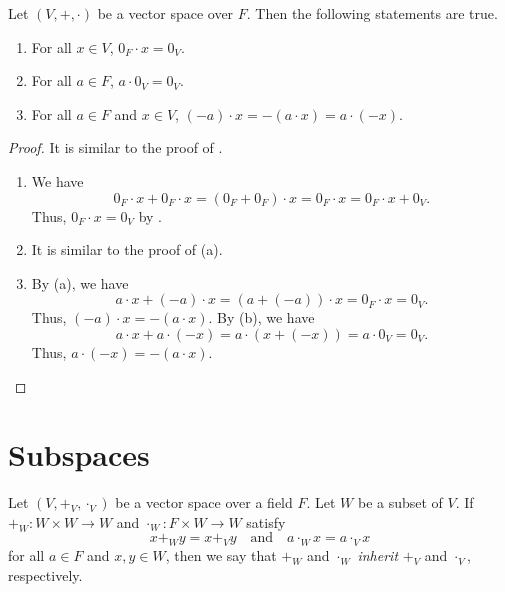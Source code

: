 \begin{theorem}\label{thm:vector-space-multiplication}
  Let $(V, +, \cdot)$ be a vector space over $F$.
  Then the following statements are true.
  \begin{enumerate}
    \item For all $x \in V$, $0_F \cdot x = 0_V$.
    \item For all $a \in F$, $a \cdot 0_V = 0_V$.
    \item For all $a \in F$ and $x \in V$,
      $(-a) \cdot x = -(a \cdot x) = a \cdot (-x)$.
  \end{enumerate}
\end{theorem}
\begin{proof}
  It is similar to the proof of .
  \begin{enumerate}
    \item We have
      $$
      0_F \cdot x + 0_F \cdot x
      = (0_F + 0_F) \cdot x
      = 0_F \cdot x
      = 0_F \cdot x + 0_V.
      $$
      Thus, $0_F \cdot x = 0_V$ by .
    \item It is similar to the proof of (a).
    \item By (a), we have
      $$
      a \cdot x + (-a) \cdot x
      = (a + (-a)) \cdot x
      = 0_F \cdot x
      = 0_V.
      $$
      Thus, $(-a) \cdot x = -(a \cdot x)$.
      By (b), we have
      $$
      a \cdot x + a \cdot (-x)
      = a \cdot (x + (-x))
      = a \cdot 0_V
      = 0_V.
      $$
      Thus, $a \cdot (-x) = -(a \cdot x)$. \qedhere
  \end{enumerate}
\end{proof}

\section{Subspaces}
\begin{definition}\label{def:inheritance}
  Let $(V, +_V, \cdot_V)$ be a vector space over a field $F$.
  Let $W$ be a subset of $V$.
  If $+_W: W \times W \to W$ and $\cdot_W: F \times W \to W$
  satisfy
  \begin{equation*}
    x +_W y = x +_V y
      \quad \text{and}
      \quad a \cdot_W x = a \cdot_V x
  \end{equation*}
  for all $a \in F$ and $x, y \in W$, then we say that $+_W$ and $\cdot_W$
  \emph{inherit} $+_V$ and $\cdot_V$, respectively.
\end{definition}

